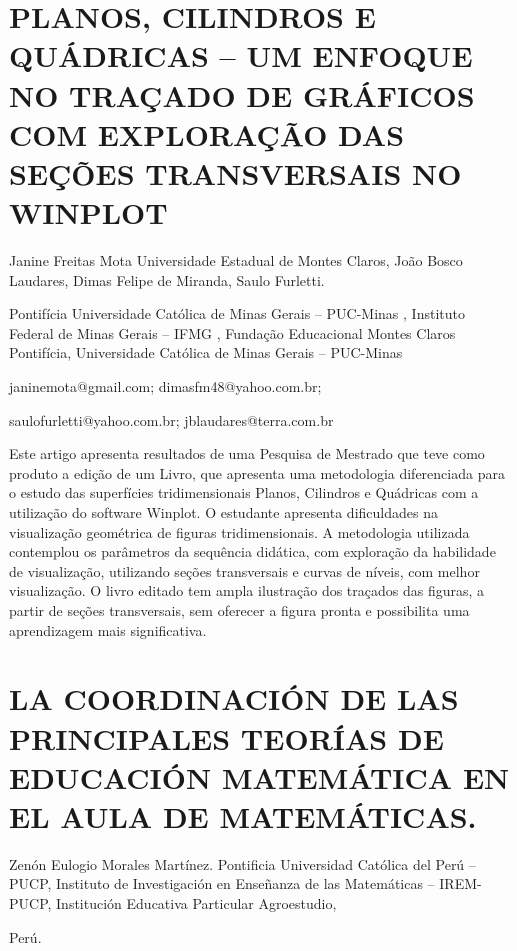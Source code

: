 \section{PLANOS, CILINDROS E QUÁDRICAS – UM ENFOQUE NO TRAÇADO DE GRÁFICOS
COM EXPLORAÇÃO DAS SEÇÕES TRANSVERSAIS NO WINPLOT}

\begin{datos}

Janine Freitas Mota Universidade Estadual de Montes Claros, João Bosco
Laudares, Dimas Felipe de Miranda, Saulo Furletti.

Pontifícia Universidade Católica de Minas Gerais – PUC-Minas , Instituto
Federal de Minas Gerais – IFMG , Fundação Educacional Montes Claros
Pontifícia, Universidade Católica de Minas Gerais – PUC-Minas

janinemota@gmail.com; dimasfm48@yahoo.com.br;

saulofurletti@yahoo.com.br; jblaudares@terra.com.br

\end{datos}

Este artigo apresenta resultados de uma Pesquisa de Mestrado que teve
como produto a edição de um Livro, que apresenta uma metodologia diferenciada
para o estudo das superfícies tridimensionais Planos, Cilindros e
Quádricas com a utilização do software Winplot. O estudante apresenta
dificuldades na visualização geométrica de figuras tridimensionais.
A metodologia utilizada contemplou os parâmetros da sequência didática,
com exploração da habilidade de visualização, utilizando seções transversais
e curvas de níveis, com melhor visualização. O livro editado tem ampla
ilustração dos traçados das figuras, a partir de seções transversais,
sem oferecer a figura pronta e possibilita uma aprendizagem mais significativa.


\section{LA COORDINACIÓN DE LAS PRINCIPALES TEORÍAS DE EDUCACIÓN MATEMÁTICA
EN EL AULA DE MATEMÁTICAS.}

\begin{datos}

Zenón Eulogio Morales Martínez. Pontificia Universidad Católica del
Perú – PUCP, Instituto de Investigación en Enseñanza de las Matemáticas
– IREM-PUCP, Institución Educativa Particular Agroestudio,

Perú.

\end{datos}

